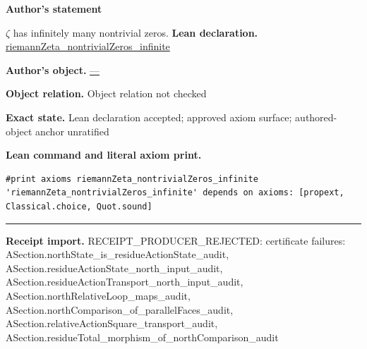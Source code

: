 \documentclass[11pt]{article}
\theoremstyle{plain}
\theoremstyle{definition}
\theoremstyle{remark}
\begin{document}
\begin{tcolorbox}[provenancecard,title={4. Corollary - Infinitude of the nontrivial zeros},title after break={4. Corollary - Infinitude of the nontrivial zeros (continued)}]
\textbf{Author's statement}\par
$\zeta$ has infinitely many nontrivial zeros.
\tcblower
\textbf{Lean declaration.} \url{riemannZeta_nontrivialZeros_infinite}
\par\textbf{Author's object.} \url{—}
\par\textbf{Object relation.} Object relation not checked
\par\textbf{Exact state.} Lean declaration accepted; approved axiom surface; authored-object anchor unratified
\par\smallskip\textbf{Lean command and literal axiom print.}
\begin{Verbatim}[breaklines=true,breakanywhere=true,fontsize=\small]
#print axioms riemannZeta_nontrivialZeros_infinite
'riemannZeta_nontrivialZeros_infinite' depends on axioms: [propext, Classical.choice, Quot.sound]
\end{Verbatim}
\medskip\hrule\medskip
\textbf{Receipt import.} \textcolor{KgtRed}{RECEIPT\_PRODUCER\_REJECTED: certificate failures: ASection.northState\_is\_residueActionState\_audit, ASection.residueActionState\_north\_input\_audit, ASection.residueActionTransport\_north\_input\_audit, ASection.northRelativeLoop\_maps\_audit, ASection.northComparison\_of\_parallelFaces\_audit, ASection.relativeActionSquare\_transport\_audit, ASection.residueTotal\_morphism\_of\_northComparison\_audit}
\end{tcolorbox}
\medskip
\end{document}

